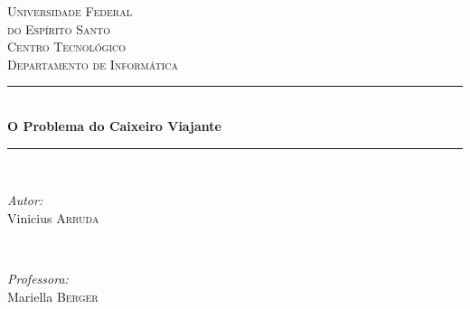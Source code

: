 \documentclass[a4paper,12pt]{article}
\begin{document}
 



\begin{titlepage}

\newcommand{\HRule}{\rule{\linewidth}{0.5mm}} %

\center %
 

\textsc{\LARGE Universidade Federal\\do Espírito Santo}\\[1.5cm] %
\textsc{\Large Centro Tecnológico}\\[0.5cm] %
\textsc{\large Departamento de Informática}\\[0.5cm] %


\HRule \\[0.4cm]
{ \huge \bfseries O Problema do Caixeiro Viajante}\\[0.4cm] %
\HRule \\[1.5cm]


\begin{minipage}{0.4\textwidth}
\begin{flushleft} \large
\emph{Autor:}\\
Vinicius \textsc{Arruda} %
\end{flushleft}
\end{minipage}
~
\begin{minipage}{0.4\textwidth}
\begin{flushright} \large
\emph{Professora:} \\
Mariella \textsc{Berger} %
\end{flushright}
\end{minipage}\\[2cm]


\end{titlepage}
\end{document}
